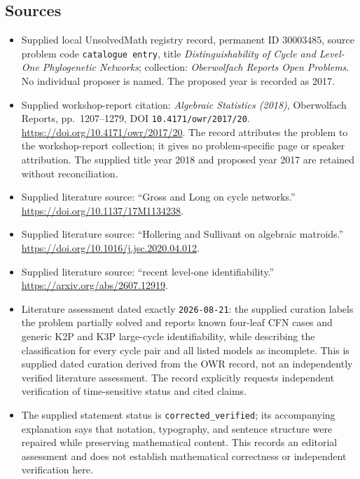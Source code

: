 \documentclass[11pt]{article}
\begin{document}
\subsection{Sources}
\begin{itemize}
\item Supplied local UnsolvedMath registry record, permanent ID \(30003485\), source problem code \texttt{catalogue entry}, title \emph{Distinguishability of Cycle and Level-One Phylogenetic Networks}; collection: \emph{Oberwolfach Reports Open Problems}. No individual proposer is named. The proposed year is recorded as 2017.
\item Supplied workshop-report citation: \emph{Algebraic Statistics (2018)}, Oberwolfach Reports, pp.\ 1207--1279, DOI \texttt{10.4171/owr/2017/20}. \url{https://doi.org/10.4171/owr/2017/20}. The record attributes the problem to the workshop-report collection; it gives no problem-specific page or speaker attribution. The supplied title year 2018 and proposed year 2017 are retained without reconciliation.
\item Supplied literature source: ``Gross and Long on cycle networks.'' \url{https://doi.org/10.1137/17M1134238}.
\item Supplied literature source: ``Hollering and Sullivant on algebraic matroids.'' \url{https://doi.org/10.1016/j.jsc.2020.04.012}.
\item Supplied literature source: ``recent level-one identifiability.'' \url{https://arxiv.org/abs/2607.12919}.
\item Literature assessment dated exactly \texttt{2026-08-21}: the supplied curation labels the problem partially solved and reports known four-leaf CFN cases and generic K2P and K3P large-cycle identifiability, while describing the classification for every cycle pair and all listed models as incomplete. This is supplied dated curation derived from the OWR record, not an independently verified literature assessment. The record explicitly requests independent verification of time-sensitive status and cited claims.
\item The supplied statement status is \texttt{corrected\_verified}; its accompanying explanation says that notation, typography, and sentence structure were repaired while preserving mathematical content. This records an editorial assessment and does not establish mathematical correctness or independent verification here.
\end{itemize}
\end{document}
